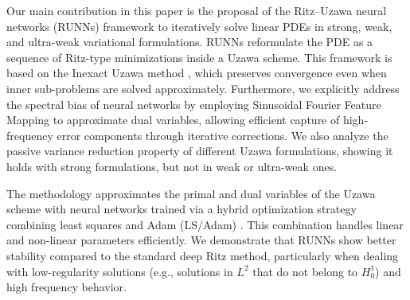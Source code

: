 \documentclass{article}
\theoremstyle{definition}
\begin{document}
Our main contribution in this paper is the proposal of the Ritz--Uzawa neural networks (RUNNs) framework to iteratively solve linear PDEs in strong, weak, and ultra-weak variational formulations. RUNNs reformulate the PDE as a sequence of Ritz-type minimizations inside a Uzawa scheme. This framework is based on the Inexact Uzawa method \cite{bramble1997analysis}, which preserves convergence even when inner sub-problems are solved approximately. Furthermore, we explicitly address the spectral bias of neural networks \cite{tancik2020fourier,sitzmann2020implicit, wang2024} by employing Sinusoidal Fourier Feature Mapping to approximate dual variables, allowing efficient capture of high-frequency error components through iterative corrections. We also analyze the passive variance reduction property of different Uzawa formulations, showing it holds with strong formulations, but not in weak or ultra-weak ones.

The methodology approximates the primal and dual variables of the Uzawa scheme with neural networks trained via a hybrid optimization strategy combining least squares and Adam (LS/Adam) \cite{uriarte2025vpinnsLS, Cyr2019RobustTA, kingma2017adam}. This combination handles linear and non-linear parameters efficiently. We demonstrate that RUNNs show better stability compared to the standard deep Ritz method, particularly when dealing with low-regularity solutions (e.g., solutions in $L^2$ that do not belong to $H^1_0$) and high frequency behavior.
\end{document}

